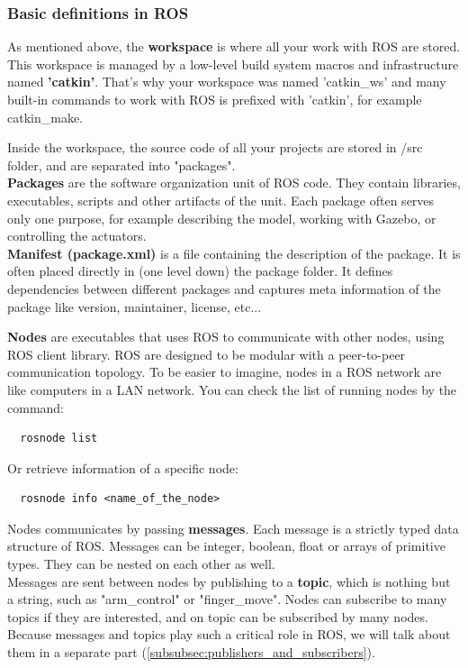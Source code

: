\documentclass[pdftex,12pt,a4paper]{article}
\begin{document}
  \newpage
  \subsubsection{Basic definitions in ROS}
  As mentioned above, the \textbf{workspace} is where all your work with ROS are stored. This workspace is managed by a low-level build system macros and infrastructure named \textbf{'catkin'}. That's why your workspace was named 'catkin\_ws' and many built-in commands to work with ROS is prefixed with 'catkin', for example catkin\_make.\par
  Inside the workspace, the source code of all your projects are stored in /src folder, and are separated into "packages".\\
  \textbf{Packages} are the software organization unit of ROS code. They contain libraries, executables, scripts and other artifacts of the unit. Each package often serves only one purpose, for example describing the model, working with Gazebo, or controlling the actuators. \\
  \textbf{Manifest (package.xml)} is a file containing the description of the package. It is often placed directly in (one level down) the package folder. It defines dependencies between different packages and captures meta information of the package like version, maintainer, license, etc...\par
  \textbf{Nodes} are executables that uses ROS to communicate with other nodes, using ROS client library. ROS are designed to be modular with a peer-to-peer communication topology. To be easier to imagine, nodes in a ROS network are like computers in a LAN network. You can check the list of running nodes by the command:
  \begin{lstlisting}
  rosnode list
  \end{lstlisting}
  Or retrieve information of a specific node:
  \begin{lstlisting}
  rosnode info <name_of_the_node>
  \end{lstlisting}
  Nodes communicates by passing \textbf{messages}. Each message is a strictly typed data structure of ROS. Messages can be integer, boolean, float or arrays of primitive types. They can be nested on each other as well.\\
  Messages are sent between nodes by publishing to a \textbf{topic}, which is nothing but a string, such as "arm\_control" or "finger\_move". Nodes can subscribe to many topics if they are interested, and on topic can be subscribed by many nodes. Because messages and topics play such a critical role in ROS, we will talk about them in a separate part (\ref{subsubsec:publishers_and_subscribers}).
  
\end{document}
